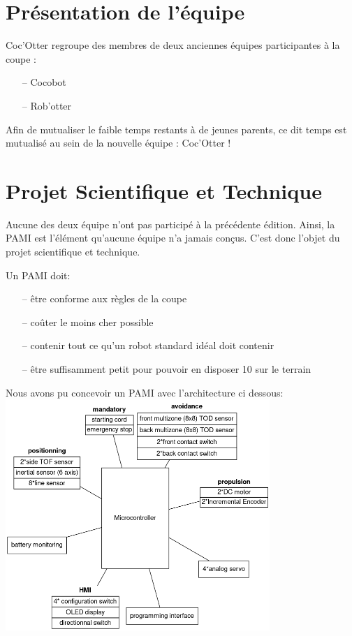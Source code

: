 \documentclass{article}
\begin{document}
\section{Présentation de l'équipe}
Coc'Otter regroupe des membres de deux anciennes équipes participantes à la coupe : 
\begin{itemize}
\item[--] Cocobot
\item[--] Rob'otter
\end{itemize}
Afin de mutualiser le faible temps restants à de jeunes parents, ce dit temps est mutualisé au sein de la nouvelle équipe : Coc'Otter !

\section{Projet Scientifique et Technique}

Aucune des deux équipe n'ont pas participé à la précédente édition. Ainsi, la PAMI est l'élément qu'aucune équipe n'a jamais conçus.
C'est donc l'objet du projet scientifique et technique.

Un PAMI doit: 
\begin{itemize}
\item[--] être conforme aux règles de la coupe
\item[--] coûter le moins cher possible
\item[--] contenir tout ce qu'un robot standard idéal doit contenir
\item[--] être suffisamment petit pour pouvoir en disposer 10 sur le terrain
\end{itemize}

Nous avons pu concevoir un PAMI avec l'architecture ci dessous:\\
\includegraphics[width = 10cm]{test}
\end{document}
